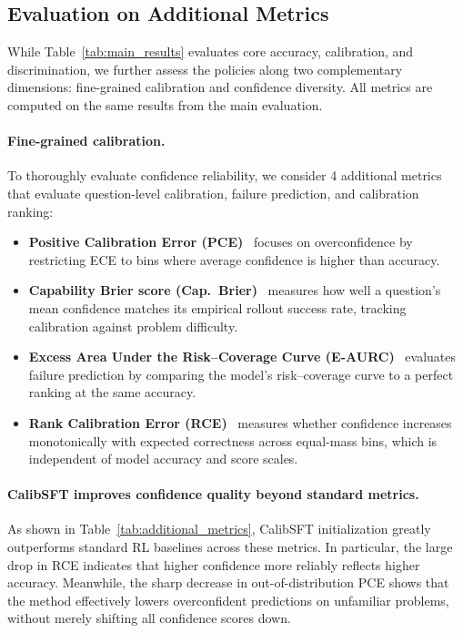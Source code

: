 \documentclass{article} %
\begin{document}



\subsection{Evaluation on Additional Metrics}
\label{sec:additional_metrics}

While Table~\ref{tab:main_results} evaluates core accuracy, 
calibration, and discrimination, 
we further assess the policies along two complementary dimensions: 
fine-grained calibration and confidence diversity. 
All metrics are computed on the same results from the main evaluation.

\paragraph{Fine-grained calibration.}
To thoroughly evaluate confidence reliability, 
we consider 4 additional metrics that evaluate question-level calibration, failure prediction, and calibration ranking:
\begin{itemize}
    \item \textbf{Positive Calibration Error (PCE)}~\citep{ma2026decoupling} focuses on overconfidence by restricting ECE to bins where average confidence is higher than accuracy.

    \item \textbf{Capability Brier score (Cap.\ Brier)}~\citep{yang2026calibration} measures how well a question's mean confidence matches its empirical rollout success rate, tracking calibration against problem difficulty.

    \item \textbf{Excess Area Under the Risk--Coverage Curve (E-AURC)}~\citep{geifman2019bias} evaluates failure prediction by comparing the model's risk--coverage curve to a perfect ranking at the same accuracy.

    \item \textbf{Rank Calibration Error (RCE)}~\citep{huang2024uncertainty} measures whether confidence increases monotonically with expected correctness across equal-mass bins, which is independent of model accuracy and score scales.
\end{itemize}



\paragraph{CalibSFT improves confidence quality beyond standard metrics.}
As shown in Table~\ref{tab:additional_metrics}, CalibSFT initialization greatly outperforms standard RL baselines across these metrics.
In particular, the large drop in RCE indicates that higher confidence more reliably reflects higher accuracy.
Meanwhile, the sharp decrease in out-of-distribution PCE shows that the method effectively lowers overconfident predictions on unfamiliar problems, without merely shifting all confidence scores down.
\end{document}
